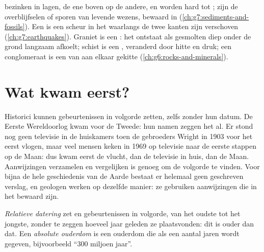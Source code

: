 \begin{recall}
 bezinken in lagen, de ene boven op de andere, en worden hard
tot ;  zijn de overblijfselen of sporen van
levende wezens, bewaard in  (\cref{ch:g7:sediments-and-fossils}).
Een \emph{} is een scheur in het  waarlangs de twee kanten
zijn verschoven (\cref{ch:g7:earthquakes}). Graniet is een
\emph{}: het ontstaat als gesmolten  diep onder
de grond langzaam afkoelt; schist is een \emph{},
veranderd door hitte en druk; een conglomeraat is een 
van aan elkaar gekitte  (\cref{ch:g6:rocks-and-minerals}).
\end{recall}

\section{Wat kwam eerst?}

Historici kunnen gebeurtenissen in volgorde zetten, zelfs zonder hun
datum. De Eerste Wereldoorlog kwam voor de Tweede: hun namen zeggen het al.
Er stond nog geen televisie in de huiskamers toen de gebroeders Wright in
1903 voor het eerst vlogen, maar veel mensen keken in 1969 op televisie naar
de eerste stappen op de Maan: dus kwam eerst de vlucht, dan de televisie in
huis, dan de Maan. Aanwijzingen verzamelen en vergelijken is genoeg om de
volgorde te vinden. Voor bijna de hele geschiedenis van de Aarde bestaat er
helemaal geen geschreven verslag, en geologen werken op dezelfde manier:
ze gebruiken aanwijzingen die in het  bewaard zijn.

\begin{definition}\label{def:g7:geological-time:relative-dating}
\emph{Relatieve datering} zet  en
gebeurtenissen in volgorde, van het oudste tot het jongste, zonder te zeggen
hoeveel jaar geleden ze plaatsvonden: dit  is ouder dan dat. Een
\emph{absolute ouderdom} is een ouderdom die als
een aantal jaren wordt gegeven, bijvoorbeeld ``\num{300} miljoen jaar''.
\end{definition}

